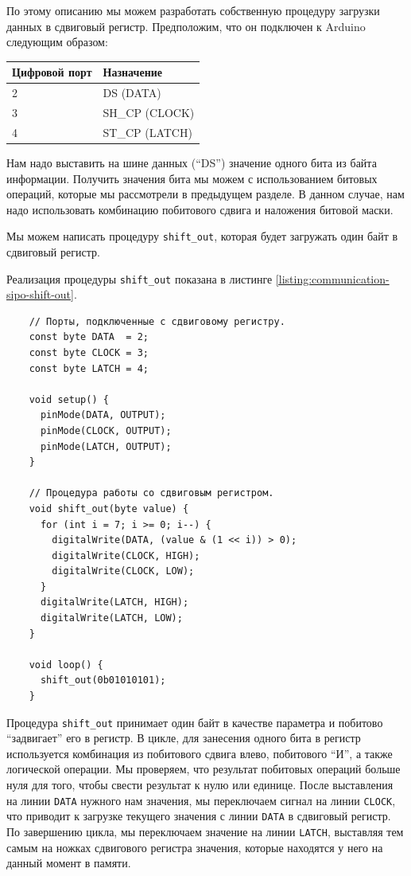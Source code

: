 \documentclass[../sparc.tex]{subfiles}
\begin{document}
По этому описанию мы можем разработать собственную процедуру загрузки данных в
сдвиговый регистр.  Предположим, что он подключен к Arduino следующим образом:

\begin{tabular}{ | m{3.0cm} | m{3.0cm} | }
  \hline
  \textbf{Цифровой порт} & \textbf{Назначение} \\
  \hline
  2 & DS (DATA)\\
  \hline
  3 & SH\_CP (CLOCK) \\
  \hline
  4 & ST\_CP (LATCH) \\
  \hline
\end{tabular}

Нам надо выставить на шине данных (``DS'') значение одного бита из байта
информации.  Получить значения бита мы можем с использованием битовых операций,
которые мы рассмотрели в предыдущем разделе.  В данном случае, нам надо
использовать комбинацию побитового сдвига и наложения битовой маски.

Мы можем написать процедуру \texttt{shift_out}, которая будет загружать
один байт в сдвиговый регистр.

Реализация процедуры \texttt{shift_out} показана в листинге
\ref{listing:communication-sipo-shift-out}.

\begin{listing}[H]
  \begin{verbatim}
    // Порты, подключенные с сдвиговому регистру.
    const byte DATA  = 2;
    const byte CLOCK = 3;
    const byte LATCH = 4;

    void setup() {
      pinMode(DATA, OUTPUT);
      pinMode(CLOCK, OUTPUT);
      pinMode(LATCH, OUTPUT);
    }

    // Процедура работы со сдвиговым регистром.
    void shift_out(byte value) {
      for (int i = 7; i >= 0; i--) {
        digitalWrite(DATA, (value & (1 << i)) > 0);
        digitalWrite(CLOCK, HIGH);
        digitalWrite(CLOCK, LOW);
      }
      digitalWrite(LATCH, HIGH);
      digitalWrite(LATCH, LOW);
    }

    void loop() {
      shift_out(0b01010101);
    }
  \end{verbatim}
  \label{listing:communication-sipo-shift-out}
  \caption{Процедура последовательной загрузки одного байта в сдвиговый
    регистр.}
\end{listing}

Процедура \texttt{shift_out} принимает один байт в качестве параметра и
побитово ``задвигает'' его в регистр.  В цикле, для занесения одного бита в
регистр используется комбинация из побитового сдвига влево, побитового ``И'', а
также логической операции.  Мы проверяем, что результат побитовых операций
больше нуля для того, чтобы свести результат к нулю или единице.  После
выставления на линии \texttt{DATA} нужного нам значения, мы переключаем
сигнал на линии \texttt{CLOCK}, что приводит к загрузке текущего
значения с линии \texttt{DATA} в сдвиговый регистр.  По завершению
цикла, мы переключаем значение на линии \texttt{LATCH}, выставляя тем
самым на ножках сдвигового регистра значения, которые находятся у него на данный
момент в памяти.
\end{document}
